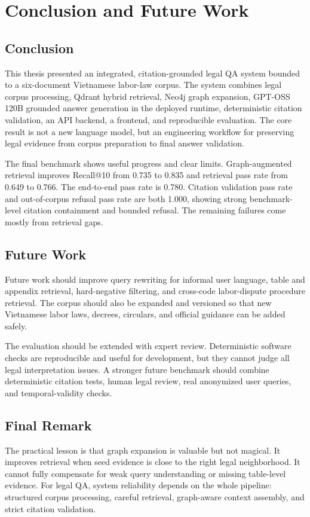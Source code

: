 \section{Conclusion and Future Work}

\subsection{Conclusion}
This thesis presented an integrated, citation-grounded legal QA system bounded to a six-document Vietnamese labor-law corpus. The system combines legal corpus processing, Qdrant hybrid retrieval, Neo4j graph expansion, GPT-OSS 120B grounded answer generation in the deployed runtime, deterministic citation validation, an API backend, a frontend, and reproducible evaluation. The core result is not a new language model, but an engineering workflow for preserving legal evidence from corpus preparation to final answer validation.

The final benchmark shows useful progress and clear limits. Graph-augmented retrieval improves Recall@10 from 0.735 to 0.835 and retrieval pass rate from 0.649 to 0.766. The end-to-end pass rate is 0.780. Citation validation pass rate and out-of-corpus refusal pass rate are both 1.000, showing strong benchmark-level citation containment and bounded refusal. The remaining failures come mostly from retrieval gaps.

\subsection{Future Work}
Future work should improve query rewriting for informal user language, table and appendix retrieval, hard-negative filtering, and cross-code labor-dispute procedure retrieval. The corpus should also be expanded and versioned so that new Vietnamese labor laws, decrees, circulars, and official guidance can be added safely.

The evaluation should be extended with expert review. Deterministic software checks are reproducible and useful for development, but they cannot judge all legal interpretation issues. A stronger future benchmark should combine deterministic citation tests, human legal review, real anonymized user queries, and temporal-validity checks.

\subsection{Final Remark}
The practical lesson is that graph expansion is valuable but not magical. It improves retrieval when seed evidence is close to the right legal neighborhood. It cannot fully compensate for weak query understanding or missing table-level evidence. For legal QA, system reliability depends on the whole pipeline: structured corpus processing, careful retrieval, graph-aware context assembly, and strict citation validation.
